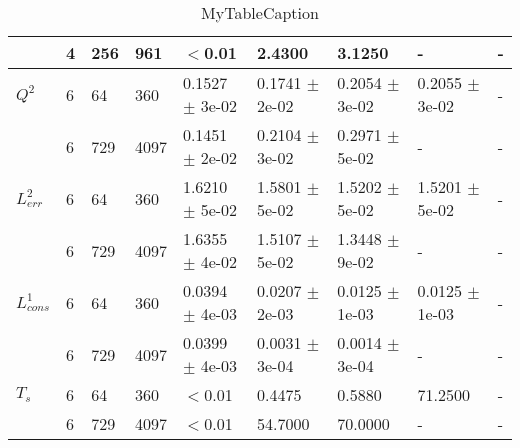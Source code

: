 \documentclass[a4paper,10pt]{article}
\begin{document}
\begin{table}
\begin{tabular}{|l|l|l|l|l|l|l|l|l|}
\hline
 & 4 & 256 & 961 & $<$0.01 & 2.4300 & 3.1250 & - & - \\
\hline
$Q^2$ & 6 & 64 & 360 & 0.1527 $\pm$ 3e-02 & 0.1741 $\pm$ 2e-02 & 0.2054 $\pm$ 3e-02 & 0.2055 $\pm$ 3e-02 & - \\
\hline
 & 6 & 729 & 4097 & 0.1451 $\pm$ 2e-02 & 0.2104 $\pm$ 3e-02 & 0.2971 $\pm$ 5e-02 & - & - \\
\hline
$L_{err}^2$ & 6 & 64 & 360 & 1.6210 $\pm$ 5e-02 & 1.5801 $\pm$ 5e-02 & 1.5202 $\pm$ 5e-02 & 1.5201 $\pm$ 5e-02 & - \\
\hline
 & 6 & 729 & 4097 & 1.6355 $\pm$ 4e-02 & 1.5107 $\pm$ 5e-02 & 1.3448 $\pm$ 9e-02 & - & - \\
\hline
$L_{cons}^1$ & 6 & 64 & 360 & 0.0394 $\pm$ 4e-03 & 0.0207 $\pm$ 2e-03 & 0.0125 $\pm$ 1e-03 & 0.0125 $\pm$ 1e-03 & - \\
\hline
 & 6 & 729 & 4097 & 0.0399 $\pm$ 4e-03 & 0.0031 $\pm$ 3e-04 & 0.0014 $\pm$ 3e-04 & - & - \\
\hline
$T_s$ & 6 & 64 & 360 & $<$0.01 & 0.4475 & 0.5880 & 71.2500 & - \\
\hline
 & 6 & 729 & 4097 & $<$0.01 & 54.7000 & 70.0000 & - & - \\
\hline
\end{tabular}
\caption{MyTableCaption}
\label{table:MyTableLabel}
\end{table}
\end{document}
